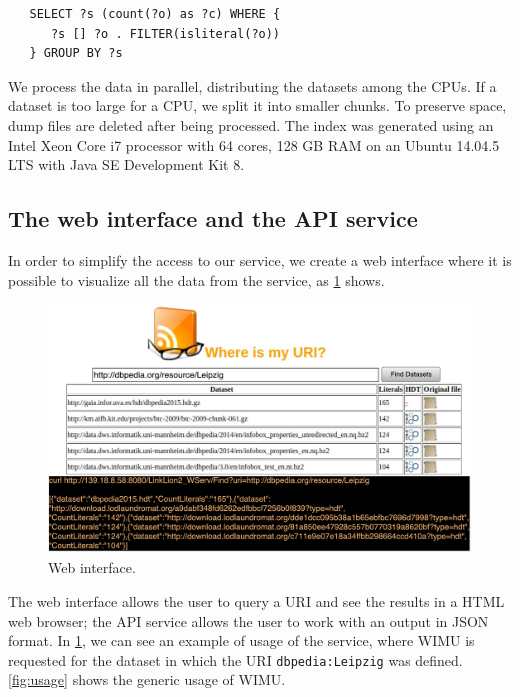 \begin{verbatim}
   SELECT ?s (count(?o) as ?c) WHERE {
      ?s [] ?o . FILTER(isliteral(?o))  
   } GROUP BY ?s
\end{verbatim}

We process the data in parallel, distributing the datasets among the CPUs. 
If a dataset is too large for a CPU, we split it into smaller chunks.
To preserve space, dump files are deleted after being processed.
The index was generated using an Intel Xeon Core i7 processor with 64 cores, 128 GB RAM on an Ubuntu 14.04.5 LTS with Java SE Development Kit 8. %

\subsection{The web interface and the API service}

In order to simplify the access to our service, we create a web interface where it is possible to visualize all the data from the service, as \cref{fig:web} shows. 

\begin{figure}[htb] 
	\centering
	\includegraphics[width=350pt]{img/web.pdf}
	\caption{Web interface.}
	\label{fig:web}
\end{figure}

The web interface allows the user to query a URI and see the results in a HTML web browser; the API service allows the user to work with an output in JSON format. %
In \cref{fig:web}, we can see an example of usage of the service, where WIMU is requested for the dataset in which the URI \texttt{dbpedia:Leipzig} was defined.
\cref{fig:usage} shows the generic usage of WIMU.



